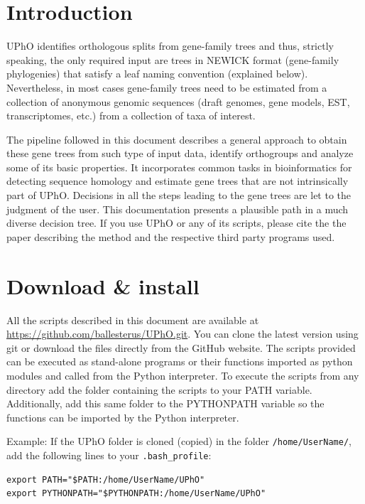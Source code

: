 \documentclass[10pt]{article}
\begin{document}
\clearpage

\tableofcontents
\section{Introduction} UPhO identifies orthologous splits from
gene-family trees and thus, strictly speaking, the only required input
are trees in NEWICK format (gene-family phylogenies) that satisfy a leaf naming
convention (explained below). Nevertheless, in most cases gene-family
trees need to be estimated from a collection of anonymous genomic
sequences (draft genomes, gene models, EST, transcriptomes, etc.) from
a collection of taxa of interest.

The pipeline followed in this document describes a general approach to obtain
these gene trees from such type of input data, identify orthogroups and
analyze some of its basic properties. It incorporates common tasks in
bioinformatics for detecting sequence homology and estimate gene trees
that are not intrinsically part of UPhO. Decisions in all the steps
leading to the gene trees are let to the  judgment of the user. This
documentation presents a plausible path in a much diverse
decision tree. If you use UPhO or any of its scripts, please cite the
the paper describing the method \citep{Ballesteros2016} and the respective 
third party programs used.

\section{Download \& install} All the scripts described in this
document are available at
\url{https://github.com/ballesterus/UPhO.git}. You can clone the
latest version using git or download the files directly from the
GitHub website.  The scripts provided can be executed as stand-alone
programs or their functions imported as python modules and called from
the Python interpreter. To execute the scripts from any directory add
the folder containing the scripts to your PATH variable. Additionally,
add this same folder to the PYTHONPATH variable so the functions can
be imported by the Python interpreter.

Example: If the UPhO folder is cloned (copied) in the folder
\texttt{/home/UserName/}, add the following
lines to your \texttt{.bash\_profile}:
 
\begin{lstlisting} 
export PATH="$PATH:/home/UserName/UPhO" 
export PYTHONPATH="$PYTHONPATH:/home/UserName/UPhO"
\end{lstlisting}
\end{document}
